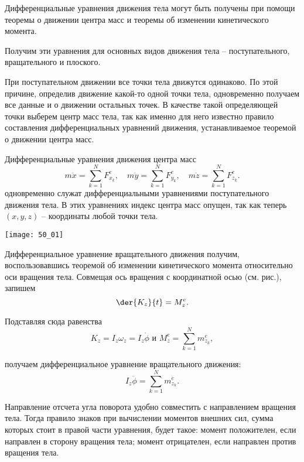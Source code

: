 Дифференциальные уравнения движения тела могут быть получены при помощи теоремы
о движении центра масс и теоремы об изменении кинетического момента.

Получим эти уравнения для основных видов движения тела -- поступательного,
вращательного и плоского.

При поступательном движении все точки тела движутся одинаково. По этой причине,
определив движение какой-то одной точки тела, одновременно получаем все данные и
о движении остальных точек. В качестве такой определяющей точки выберем центр
масс тела, так как именно для него известно правило составления дифференциальных
уравнений движения, устанавливаемое теоремой о движении центра масс.

Дифференциальные уравнения движения центра масс
\[
    m\ddot{x} = \sum_{k=1}^N F^e_{x_k},
    \quad m\ddot{y} = \sum_{k=1}^N F^e_{y_k},
    \quad m\ddot{z} = \sum_{k=1}^N F^e_{z_k}.
\] 
одновременно служат дифференциальными уравнениями поступательного движения тела.
В этих уравнениях индекс центра масс опущен, так как теперь \( (x, y, z) \) --
координаты любой точки тела.

\begin{minipage}{.4\textwidth}
    \texttt{[image: 50\_01]}
\end{minipage}\hfill
\begin{minipage}{.55\textwidth}
Дифференциальное уравнение вращательного движения получим, воспользовавшись
теоремой об изменении кинетического момента относительно оси вращения тела.
Совмещая ось вращения с координатной осью (см. рис.), запишем
\[
    \der{K_z}{t} = M^e_z.
\]
 
Подставляя сюда равенства
\[
    K_z = I_z\omega_z = I_z\dot{\phi} \text{ и }
    M^e_z = \sum_{k=1}^N m^e_{z_k},
\]
\end{minipage}
получаем дифференциальное уравнение вращательного движения:
\[
    I_z\ddot{\phi} = \sum_{k=1}^N m^e_{z_k}.
\]
 
Направление отсчета угла поворота удобно совместить с направлением вращения
тела. Тогда правило знаков при вычислении моментов внешних сил, сумма которых
стоит в правой части уравнения, будет такое: момент положителен, если направлен
в сторону вращения тела; момент отрицателен, если направлен против вращения
тела.

\newpage
